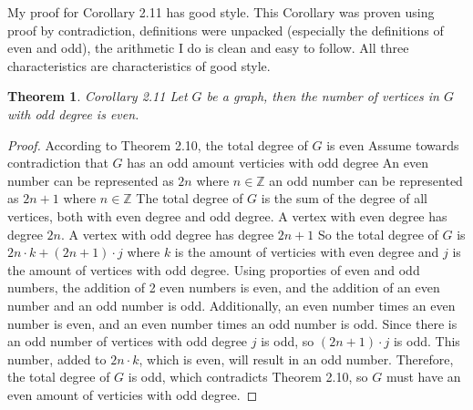 \documentclass{article}
\newtheorem*{thm}{Theorem}
\begin{document}
\begin{description}
		My proof for Corollary 2.11 has good style. This Corollary was proven using proof by contradiction, definitions were unpacked
		(especially the definitions of even and odd), the arithmetic I do is clean and easy to follow. All three characteristics are 
		characteristics of good style.
	
		\begin{thm}Corollary 2.11     Let $G$ be a graph, then the number of vertices in $G$ with odd degree is even. \end{thm}
 		\begin{proof}    According to Theorem 2.10,  the total degree of $G$ is even 
 			Assume towards contradiction that $G$ has an odd amount verticies with odd degree
  			An even number can be represented as $2n$ where $n \in \mathbb{Z}$ an odd number can be represented as $2n + 1$ where 
			$n \in \mathbb{Z}$
			The total degree of $G$ is the sum of the degree of all vertices, both with even degree and odd degree.
			A vertex with even degree has degree $2n$. A vertex with odd degree has degree $2n + 1$  
  			So the total degree of $G$ is $2n\cdot k + (2n+1)\cdot j$ where $k$ is the amount of verticies with even degree and $j$
			is the amount of vertices with odd degree.
  			Using proporties of even and odd numbers, the addition of 2 even numbers is even, and the addition of an even number 
			and an odd number is odd. Additionally, an even number times an even number is even, 
			and an even number times an odd number is odd.
			Since there is an odd number of vertices with odd degree $j$ is odd, so $(2n+1)\cdot j$ is odd. 
			This number, added to $2n\cdot k$, which is even, will result in an odd number. Therefore, the 
			total degree of $G$ is odd, which contradicts Theorem 2.10, so $G$ must have an even amount of verticies with odd degree.
  		\end{proof}


\end{description}
\end{document}

